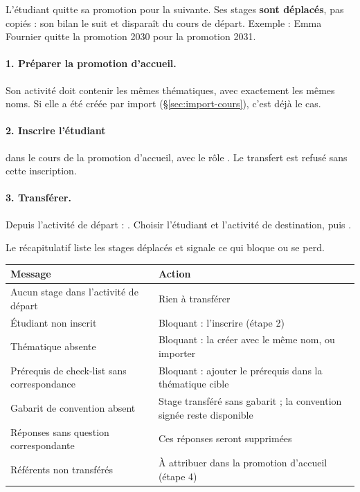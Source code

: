 \documentclass[11pt,a4paper]{article}
\begin{document}
L'étudiant quitte sa promotion pour la suivante. Ses stages \textbf{sont
déplacés}, pas copiés : son bilan le suit et disparaît du cours de départ.
Exemple : Emma Fournier quitte la promotion 2030 pour la promotion 2031.

\paragraph{1. Préparer la promotion d'accueil.} Son activité doit contenir les
mêmes thématiques, avec exactement les mêmes noms. Si elle a été créée par
import (§\ref{sec:import-cours}), c'est déjà le cas.

\paragraph{2. Inscrire l'étudiant} dans le cours de la promotion d'accueil, avec
le rôle . Le transfert est refusé sans cette inscription.

\paragraph{3. Transférer.} Depuis l'activité de départ :
. Choisir l'étudiant et
l'activité de destination, puis .


Le récapitulatif liste les stages déplacés et signale ce qui bloque ou se perd.


\begin{center}
\begin{tabularx}{\linewidth}{@{}l X@{}}
\toprule
\textbf{Message} & \textbf{Action} \\
\midrule
Aucun stage dans l'activité de départ & Rien à transférer \\
Étudiant non inscrit & Bloquant : l'inscrire (étape 2) \\
Thématique absente & Bloquant : la créer avec le même nom, ou importer \\
Prérequis de check-list sans correspondance & Bloquant : ajouter le prérequis dans la thématique cible \\
Gabarit de convention absent & Stage transféré sans gabarit ; la convention signée reste disponible \\
Réponses sans question correspondante & Ces réponses seront supprimées \\
Référents non transférés & À attribuer dans la promotion d'accueil (étape 4) \\
\bottomrule
\end{tabularx}
\end{center}
\end{document}
